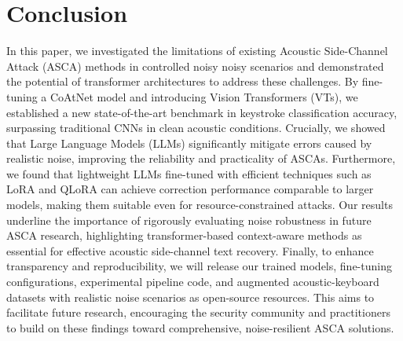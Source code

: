 
\section{Conclusion}
\label{sec:conclusion}
In this paper, we investigated the limitations of existing Acoustic Side-Channel Attack (ASCA) methods in controlled noisy noisy scenarios and demonstrated the potential of transformer architectures to address these challenges. By fine-tuning a CoAtNet model and introducing Vision Transformers (VTs), we established a new state-of-the-art benchmark in keystroke classification accuracy, surpassing traditional CNNs in clean acoustic conditions. Crucially, we showed that Large Language Models (LLMs) significantly mitigate errors caused by realistic noise, improving the reliability and practicality of ASCAs.
Furthermore, we found that lightweight LLMs fine-tuned with efficient techniques such as LoRA and QLoRA can achieve correction performance comparable to larger models, making them suitable even for resource-constrained attacks. Our results underline the importance of rigorously evaluating noise robustness in future ASCA research, highlighting transformer-based context-aware methods as essential for effective acoustic side-channel text recovery.
Finally, to enhance transparency and reproducibility, we will release our trained models, fine-tuning configurations, experimental pipeline code, and augmented acoustic-keyboard datasets with realistic noise scenarios as open-source resources. This aims to facilitate future research, encouraging the security community and practitioners to build on these findings toward comprehensive, noise-resilient ASCA solutions.


